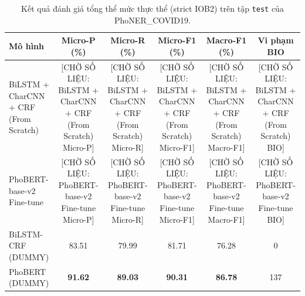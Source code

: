 \begin{table}[t]
\centering
\small
\begin{tabular}{lccccc}
\hline
\textbf{Mô hình} & \textbf{Micro-P (\%)} & \textbf{Micro-R (\%)} & \textbf{Micro-F1 (\%)} & \textbf{Macro-F1 (\%)} & \textbf{Vi phạm BIO} \\
\hline
BiLSTM + CharCNN + CRF (From Scratch) & [CHỜ SỐ LIỆU: BiLSTM + CharCNN + CRF (From Scratch) Micro-P] & [CHỜ SỐ LIỆU: BiLSTM + CharCNN + CRF (From Scratch) Micro-R] & [CHỜ SỐ LIỆU: BiLSTM + CharCNN + CRF (From Scratch) Micro-F1] & [CHỜ SỐ LIỆU: BiLSTM + CharCNN + CRF (From Scratch) Macro-F1] & [CHỜ SỐ LIỆU: BiLSTM + CharCNN + CRF (From Scratch) BIO] \\
PhoBERT-base-v2 Fine-tune & [CHỜ SỐ LIỆU: PhoBERT-base-v2 Fine-tune Micro-P] & [CHỜ SỐ LIỆU: PhoBERT-base-v2 Fine-tune Micro-R] & [CHỜ SỐ LIỆU: PhoBERT-base-v2 Fine-tune Micro-F1] & [CHỜ SỐ LIỆU: PhoBERT-base-v2 Fine-tune Macro-F1] & [CHỜ SỐ LIỆU: PhoBERT-base-v2 Fine-tune BIO] \\
BiLSTM-CRF (DUMMY) & 83.51 & 79.99 & 81.71 & 76.28 & 0 \\
PhoBERT (DUMMY) & \textbf{91.62} & \textbf{89.03} & \textbf{90.31} & \textbf{86.78} & 137 \\
\hline
\end{tabular}
\caption{Kết quả đánh giá tổng thể mức thực thể (strict IOB2) trên tập \texttt{test} của PhoNER\_COVID19.}
\label{tab:main_results}
\end{table}
